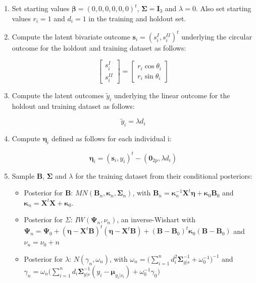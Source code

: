 \documentclass[11pt,]{article}
\begin{document}
\begin{appendices}
\begin{enumerate}
\item Set starting values $\boldsymbol{\beta} = (0,0,0,0,0,0)^t$, $\boldsymbol{\Sigma} = \boldsymbol{I}_3$ and $\lambda = 0$. Also set starting values $r_i = 1$ and $d_i = 1$ in the training and holdout set. 

\item Compute the latent bivariate outcome $\boldsymbol{s}_i = (s_i^{I}, s_i^{II})^t$ underlying the circular outcome for the holdout and training dataset as follows:

$$\begin{bmatrix} s^{I}_{i} \\ s^{II}_{i} \end{bmatrix} = \begin{bmatrix} r_i \cos \theta_i \\  r_i\sin \theta_i\end{bmatrix}$$
\item Compute the latent outcomes $\tilde{y}_i$ underlying the linear outcome for the holdout and training dataset as follows:

$$\tilde{y}_i = \lambda d_i $$

\item Compute $\boldsymbol{\eta}_i$ defined as follows for each individual i:

$$\boldsymbol{\eta}_i = (\boldsymbol{s}_i,y_i)^t - (\boldsymbol{0}_{2p}, \lambda d_i)$$

\item Sample $\boldsymbol{B}$, $\boldsymbol{\Sigma}$ and $\lambda$ for the training dataset from their conditional posteriors:

\begin{itemize}
\item Posterior for $\boldsymbol{B}$: $MN(\boldsymbol{B}_n, \boldsymbol{\kappa}_n, \boldsymbol{\Sigma}_n)$, with $\boldsymbol{B}_n = \boldsymbol{\kappa}_n^{-1}\boldsymbol{X}^t\boldsymbol{\eta} + \boldsymbol{\kappa}_0\boldsymbol{B}_0$ and $\boldsymbol{\kappa}_n = \boldsymbol{X}^t\boldsymbol{X} + \boldsymbol{\kappa}_0$.
\item Posterior for $\Sigma$: $IW(\boldsymbol{\Psi}_n, \nu_n)$, an inverse-Wishart with $\boldsymbol{\Psi}_n = \boldsymbol{\Psi}_0 + (\boldsymbol{\eta} - \boldsymbol{X}^t\boldsymbol{B})^t(\boldsymbol{\eta} - \boldsymbol{X}^t\boldsymbol{B}) + (\boldsymbol{B} - \boldsymbol{B}_0)^t\boldsymbol{\kappa}_0(\boldsymbol{B} - \boldsymbol{B}_0)$ and $\nu_n = \nu_0 + n$
\item Posterior for $\lambda$: $N(\gamma_n, \omega_n)$, with $\omega_n = \big(\sum_{i = 1}^{n}d_i^2\boldsymbol{\Sigma}_{y|s}^{-1} + \omega_0^{-1}\big)^{-1}$ and $\gamma_n = \omega_n \big(\sum_{i = 1}^{n}d_i\boldsymbol{\Sigma}_{y|s}^{-1}(y_i - \boldsymbol{\mu}_{y_i|s_i}) + \omega_0^{-1}\gamma_0 \big)$
\end{itemize}


\end{enumerate}
\end{appendices}
\end{document}
